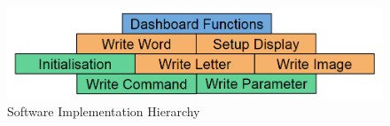 \begin{figure}[H]
\begin{center}
\includegraphics[width=12cm]{Figures/software_hierarchy.png}
\end{center}
\caption{Software Implementation Hierarchy}
\label{fig:software_hierarchy}
\end{figure}
